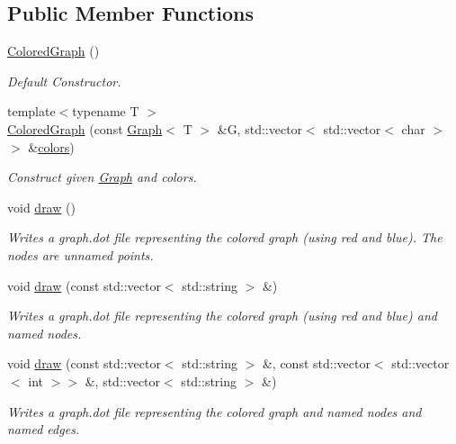 \subsection*{Public Member Functions}
\begin{DoxyCompactItemize}
\item 
\hyperlink{classMackey_1_1ColoredGraph_a367055b4a615119cc767a738f6e9e719}{Colored\+Graph} ()
\begin{DoxyCompactList}\small\item\em Default Constructor. \end{DoxyCompactList}\item 
{\footnotesize template$<$typename T $>$ }\\\hyperlink{classMackey_1_1ColoredGraph_a2e2d70fa6163019d8bf0dd92b3d39342}{Colored\+Graph} (const \hyperlink{classMackey_1_1Graph}{Graph}$<$ T $>$ \&G, std\+::vector$<$ std\+::vector$<$ char $>$$>$ \&\hyperlink{classMackey_1_1ColoredGraph_a29fbdcaf9f94f0f5d48e5390ba49b338}{colors})
\begin{DoxyCompactList}\small\item\em Construct given \hyperlink{classMackey_1_1Graph}{Graph} and colors. \end{DoxyCompactList}\item 
void \hyperlink{classMackey_1_1ColoredGraph_a8ed05073805b34a0087a7ed94e889694}{draw} ()
\begin{DoxyCompactList}\small\item\em Writes a graph.\+dot file representing the colored graph (using red and blue). The nodes are unnamed points. \end{DoxyCompactList}\item 
void \hyperlink{classMackey_1_1ColoredGraph_a912a6e5cb94386d9ff6510e968b41e7d}{draw} (const std\+::vector$<$ std\+::string $>$ \&)
\begin{DoxyCompactList}\small\item\em Writes a graph.\+dot file representing the colored graph (using red and blue) and named nodes. \end{DoxyCompactList}\item 
void \hyperlink{classMackey_1_1ColoredGraph_a88cde9e3cc3bfb72409142ac6705b474}{draw} (const std\+::vector$<$ std\+::string $>$ \&, const std\+::vector$<$ std\+::vector$<$ int $>$$>$ \&, std\+::vector$<$ std\+::string $>$ \&)
\begin{DoxyCompactList}\small\item\em Writes a graph.\+dot file representing the colored graph and named nodes and named edges. \end{DoxyCompactList}\end{DoxyCompactItemize}
